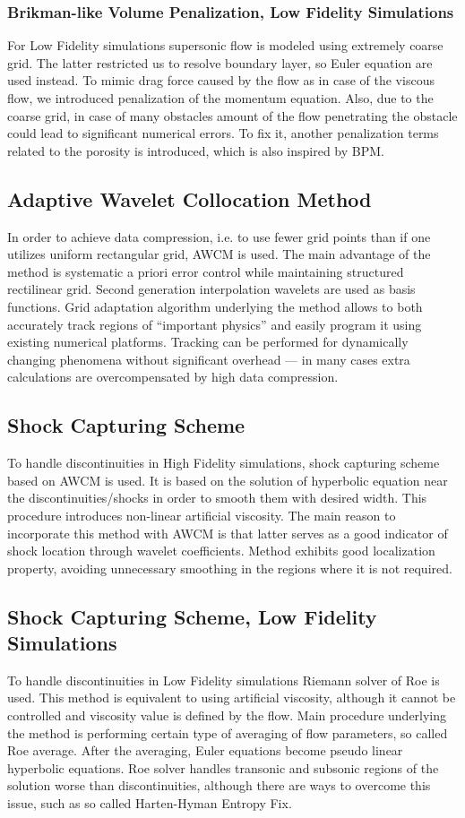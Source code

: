 \subsubsection{Brikman-like Volume Penalization, Low Fidelity Simulations}
For Low Fidelity simulations supersonic flow is modeled using extremely coarse grid. The latter restricted us to resolve boundary layer, so Euler equation are used instead. To mimic drag force caused by the flow as in case of the viscous flow, we introduced penalization of the momentum equation. Also, due to the coarse grid, in case of many obstacles amount of the flow penetrating the obstacle could lead to significant numerical errors. To fix it, another penalization terms related to the porosity is introduced, which is also inspired by BPM.

\subsection{Adaptive Wavelet Collocation Method}
In order to achieve data compression, i.e. to use fewer grid points than if one utilizes uniform rectangular grid, AWCM is used. The main advantage of the method is systematic a priori error control while maintaining structured rectilinear grid. Second generation interpolation wavelets are used as basis functions. Grid adaptation algorithm underlying the method allows to both accurately track regions of ``important physics'' and easily program it using existing numerical platforms. Tracking can be performed for dynamically changing phenomena without significant overhead --- in many cases extra calculations are overcompensated by high data compression.

\subsection{Shock Capturing Scheme}
To handle discontinuities in High Fidelity simulations, shock capturing scheme based on AWCM is used. It is based on the solution of hyperbolic equation near the discontinuities/shocks in order to smooth them with desired width. This procedure introduces non-linear artificial viscosity. The main reason to incorporate this method with AWCM is that latter serves as a good indicator of shock location through wavelet coefficients. Method exhibits good localization property, avoiding unnecessary smoothing in the regions where it is not required. 

\subsection{Shock Capturing Scheme, Low Fidelity Simulations}
To handle discontinuities in Low Fidelity simulations Riemann solver of Roe is used. This method is equivalent to using artificial viscosity, although it cannot be controlled and viscosity value is defined by the flow. Main procedure underlying the method is performing certain type of averaging of flow parameters, so called Roe average. After the averaging, Euler equations become pseudo linear hyperbolic equations. Roe solver handles transonic and subsonic regions of the solution worse than discontinuities, although there are ways to overcome this issue, such as so called Harten-Hyman Entropy Fix.

